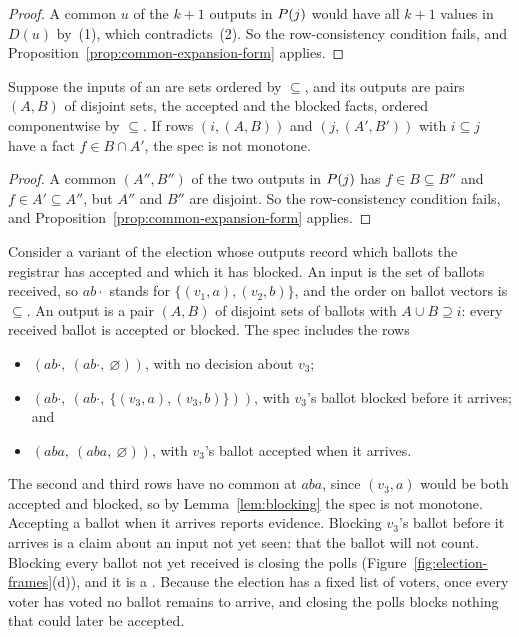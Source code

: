 \begin{proof}
A common \outnoun $u$ of the $k+1$ outputs in $P(j)$ would have all
$k+1$ values in $D(u)$ by~(1), which contradicts~(2).  So the row-consistency
condition fails, and Proposition~\ref{prop:common-expansion-form} applies.
\end{proof}

\begin{lemma}
\label{lem:blocking}
Suppose the inputs of an \spectype are sets ordered by $\subseteq$, and its
outputs are pairs $(A,B)$ of disjoint sets, the accepted and the blocked
facts, ordered componentwise by $\subseteq$.  If rows $(i,(A,B))$ and
$(j,(A',B'))$ with $i\subseteq j$ have a fact $f\in B\cap A'$, the spec is not
monotone.
\end{lemma}

\begin{proof}
A common \outnoun $(A'',B'')$ of the two outputs in $P(j)$ has
$f\in B\subseteq B''$ and $f\in A'\subseteq A''$, but $A''$ and $B''$ are
disjoint.  So the row-consistency condition fails, and
Proposition~\ref{prop:common-expansion-form} applies.
\end{proof}

Consider a variant of the election whose outputs record which ballots the
registrar has accepted and which it has blocked. An input is the set of ballots
received, so $ab\cdot$ stands for $\{(v_1,a),(v_2,b)\}$, and the order on
ballot vectors is $\subseteq$. An output is a pair $(A,B)$ of disjoint sets of
ballots with $A\cup B\supseteq i$: every received ballot is accepted or
blocked. The spec includes the rows \begin{itemize} \item $(ab\cdot,\
(ab\cdot,\ \varnothing))$, with no decision about $v_3$; \item $(ab\cdot,\
(ab\cdot,\ \{(v_3,a),(v_3,b)\}))$, with $v_3$'s ballot blocked before it
arrives; and \item $(aba,\ (aba,\ \varnothing))$, with $v_3$'s ballot accepted
when it arrives. \end{itemize} The second and third rows have no common
\outnoun at $aba$, since $(v_3,a)$ would be both accepted and blocked, so by
Lemma~\ref{lem:blocking} the spec is not monotone.  Accepting a ballot when it
arrives reports evidence.  Blocking $v_3$'s ballot before it arrives is a claim
about an input not yet seen: that the ballot will not count.  Blocking every
ballot not yet received is closing the polls
(Figure~\ref{fig:election-frames}(d)), and it is a \commitment.  Because the
election has a fixed list of voters, once every voter has voted no ballot
remains to arrive, and closing the polls blocks nothing that could later be
accepted.

